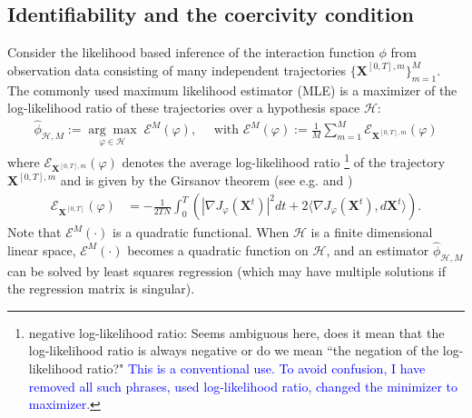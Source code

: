 \documentclass[]{elsarticle}
\def\R{\mathbb{R}}
\newcommand{\mbf}[1]{\boldsymbol{#1}}
\newcommand{\bB}{\mbf{B}}
\newcommand{\bX}{\mbf{X}}
\def\pV{J}
\newcommand{\intkernel}{\phi}
\newcommand{\intkernelvar}{\varphi}
\newcommand{\hypspace}{\mathcal{H}}
\newcommand{\argmax}[1]{\underset{#1}{\operatorname{arg}\operatorname{max}}\;}
\newcommand{\FL}[1]{\textcolor{blue}{{#1}}}
\numberwithin{equation}{section}
\numberwithin{theorem}{section}
\begin{document}
 
 


\subsection{Identifiability and the coercivity condition} \label{sec:inference}
Consider the likelihood based inference of the interaction function $\phi$ from observation data consisting of 
many independent trajectories $\{\bX^{[0,T],m}\}_{m=1}^M$. The commonly used maximum likelihood estimator (MLE) is a maximizer of the log-likelihood ratio of these trajectories over a hypothesis space $\hypspace$: 
\begin{align*}%
\widehat{\intkernel}_{\hypspace,M}:=\argmax{\intkernelvar\in \hypspace} \mathcal{E}^M(\intkernelvar), \quad   \text{ with } \mathcal{E}^M(\intkernelvar)  := \frac{1}{M}\sum_{m=1}^M  \mathcal{E}_{\bX^{[0,T],m}}(\intkernelvar)
\end{align*}
where $\mathcal{E}_{\bX^{[0,T],m}}(\intkernelvar)$ denotes the average log-likelihood ratio 
\footnote{negative log-likelihood ratio: \color{green}Seems ambiguous here, does it mean that the log-likelihood ratio is always negative or do we mean ``the negation of the log-likelihood ratio?" \FL{This is a conventional use. To avoid confusion, I have removed all such phrases, used log-likelihood ratio, changed the minimizer to maximizer.} }
of the trajectory $\bX^{[0,T],m}$  and is given by the Girsanov theorem (see e.g. \cite[Section 1.1.4]{Kut04} and \cite[Section 3.5]{KS98})
\begin{align}\label{lkhd_cts}
\mathcal{E}_{\bX^{[0,T]}}(\intkernelvar)&= - \frac{1}{2TN}\int_{0}^T \left(|\nabla \pV_{\intkernelvar}(\bX^t)|^2 dt + 2 \langle \nabla \pV_{\intkernelvar}(\bX^t), d\bX^t \rangle \right).
\end{align}
Note that $\mathcal{E}^M(\cdot)$ is a quadratic functional. When $\hypspace$ is a finite dimensional linear space, $\mathcal{E}^M(\cdot)$ becomes a quadratic function on $\hypspace$, and an estimator $\widehat{\intkernel}_{\hypspace,M}$ can be solved by least squares regression (which may have multiple solutions if the regression matrix is singular). 
\end{document}
